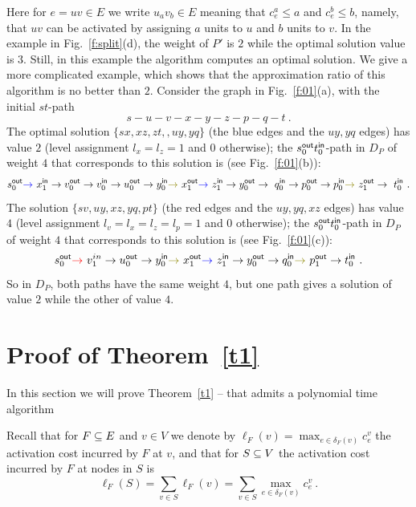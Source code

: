 \documentclass[a4paper,UKenglish,autoref]{lipics-v2019}
\begin{document}
Here for $e=uv \in E$ we write $u_a v_b \in E$ meaning that $c_e^a \leq a$ and $c_e^b \leq b$, namely,
that $uv$ can be activated by assigning $a$ units to $u$ and $b$ units to $v$.
In the example in Fig.~\ref{f:split}(d), the weight of $P'$ is $2$ while the optimal solution value is $3$. 
Still, in this example the \cite{AE} algorithm computes an optimal solution. 
We give a more complicated example, which shows that the approximation ratio of this algorithm is no better than $2$. 
Consider the graph in Fig.~\ref{f:01}(a), with the initial $st$-path 
$$
s-u-v-x-y-z-p-q-t \ .
$$
The optimal solution $\{sx,xz,zt,,uy,yq\}$ (the blue edges and the $uy,yq$ edges) has value $2$ (level assignment $l_x=l_z=1$ and $0$ otherwise);
the $s_0^{\sf out} t_0^{\sf in}$-path in $D_P$ of weight $4$ that corresponds to this solution is (see Fig.~\ref{f:01}(b)):
$$
s_0^{\sf out} 
{\color{blue} \rightarrow} \ x_1^{\sf in} \rightarrow v_0^{\sf out} \rightarrow v_0^{\sf in} \rightarrow u_0^{\sf out} \rightarrow y_0^{\sf in} 
{\color{olive} \rightarrow} \ x_1^{\sf out} 
{\color{blue} \rightarrow} \ z_1^{\sf in} \rightarrow y_0^{\sf out} \rightarrow \ q_0^{\sf in} \rightarrow p_0^{\sf out} \rightarrow p_0^{\sf in} 
{\color{olive} \rightarrow} \ z_1^{\sf out} \rightarrow \ t_0^{\sf in} \ .
$$
The solution $\{sv,uy,xz,yq,pt\}$ (the red edges and the $uy,yq,xz$ edges) has value $4$ (level assignment $l_v=l_x=l_z=l_p=1$ and $0$ otherwise);
the $s_0^{\sf out} t_0^{\sf in}$-path in $D_P$ of weight $4$ that corresponds to this solution is (see Fig.~\ref{f:01}(c)):
$$
s_0^{\sf out} 
{\color{red}   \rightarrow} \ v_1^{in} \rightarrow u_0^{\sf out} \rightarrow y_0^{\sf in} 
{\color{olive} \rightarrow} \ x_1^{\sf out} 
{\color{blue} \rightarrow} \ z_1^{\sf in} \rightarrow y_0^{\sf out} \rightarrow q_0^{\sf in} 
{\color{olive} \rightarrow} \ p_1^{\sf out} \rightarrow t_0^{\sf in} \ .
$$
So in $D_P$, both paths have the same weight $4$, 
but one path gives a solution of value $2$ while the other of value $4$. 

\section{Proof of Theorem~\ref{t1}} \label{s:1}

In this section we will prove Theorem~\ref{t1} -- that {\atdpa} admits a polynomial time algorithm

Recall that for $F \subseteq E$ and $v \in V$ we denote by $\displaystyle \ell_F(v)=\max_{e \in \delta_F(v)}c_e^v$ 
the activation cost incurred by $F$ at $v$,
and that for $S \subseteq V$ the activation cost incurred by $F$ at nodes in $S$ is
\[
\displaystyle \ell_F(S)=\sum_{v \in S} \ell_F(v) =\sum_{v \in S}\max_{e \in \delta_F(v)}c_e^v \ .
\]
\end{document}
